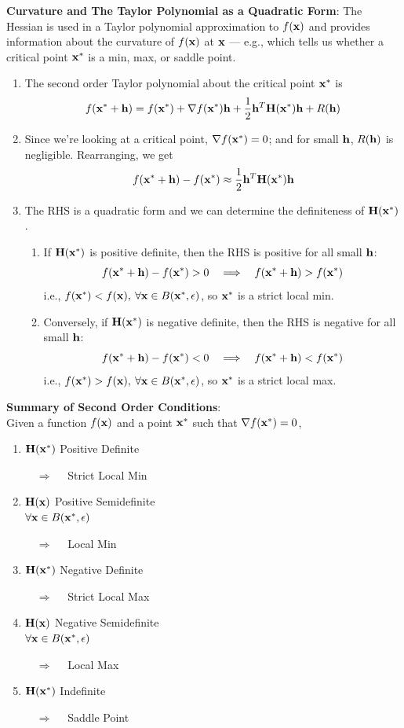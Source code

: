\documentclass[11pt]{article}
\newcommand{\be}{\begin{enumerate}}
\newcommand{\ee}{\end{enumerate}}
\newcommand{\lra}{\Longrightarrow}
\newcommand{\pbt}{\parbox[t]{2in}}
\newcommand{\eps}{\epsilon}
\newcommand{\bfx}{{\bf x}}
\newcommand{\fx}{f(\bfx)}
\begin{document}
\newcommand{\bfh}{{\bf h}}
\item {\bf Curvature and The Taylor Polynomial as a Quadratic Form}:
The Hessian is used in a Taylor polynomial approximation to $\fx$ and
provides information about the curvature of $\fx$ at $\bfx$ --- e.g., which
tells us whether a critical point $\bfx^*$ is a min, max, or saddle point.
  \be
  \item The second order Taylor polynomial about the critical point
$\bfx^*$ is
  $$f(\bfx^*+\bfh)=f(\bfx^*)+\nabla f(\bfx^*) \bfh +\frac{1}{2} \bfh^T
{\bf H(x^*)} \bfh + R(\bfh)$$
  \item Since we're looking at a critical point, $\nabla f(\bfx^*)=0$;
and for small $\bfh$, $R(\bfh)$ is negligible.  Rearranging, we get
$$f(\bfx^*+\bfh)-f(\bfx^*)\approx \frac{1}{2} \bfh^T {\bf H(x^*)}
\bfh $$
  \item The RHS is a quadratic form and we can determine the definiteness of $\bf
H(x^*)$.\\
    \be
    \item If $\bf H(x^*)$ is positive definite, then the RHS is positive
for all small $\bfh$:
$$f(\bfx^*+\bfh)-f(\bfx^*)>0 \quad\lra\quad f(\bfx^*+\bfh)>f(\bfx^*)$$
i.e., $f(\bfx^*)<f(\bfx), \: \forall \bfx\in B(\bfx^*,\eps)$, so
$\bfx^*$ is a strict local min.\\
    \item Conversely, if $\bf H(x^*)$ is negative definite, then the RHS
is negative for all small $\bfh$:
$$f(\bfx^*+\bfh)-f(\bfx^*)<0 \quad\lra\quad f(\bfx^*+\bfh)<f(\bfx^*)$$
i.e., $f(\bfx^*)>f(\bfx), \: \forall \bfx\in B(\bfx^*,\eps)$, so
$\bfx^*$ is a strict local max.\\
    \ee
  \ee

\smallskip

\item {\bf Summary of Second Order Conditions}:\\[6pt]
Given a function $\fx$ and a point $\bfx^*$ such that $\nabla
f(\bfx^*)=0$,
  \be
  \item \pbt{$\bf H(x^*)$ Positive Definite} $\quad \lra \quad$
  Strict Local Min
  \item \pbt{$\bf H(x)$ Positive Semidefinite\\ $\forall \bfx\in
B(\bfx^*,\eps)$} $\quad \lra \quad$
  Local Min
  \item \pbt{$\bf H(x^*)$ Negative Definite} $\quad \lra \quad$
  Strict Local Max
  \item \pbt{$\bf H(x)$ Negative Semidefinite\\ $\forall \bfx\in
B(\bfx^*,\eps)$} $\quad \lra \quad$
  Local Max
  \item \pbt{$\bf H(x^*)$ Indefinite} $\quad \lra \quad$
  Saddle Point
  \ee
\end{document}
